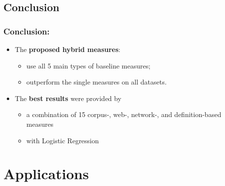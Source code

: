 \documentclass{beamer}
\begin{document}
\subsection{Conclusion}

\begin{frame}
\frametitle{Conclusion:}

\begin{itemize}
  


\item The \textbf{proposed hybrid measures}:


\begin{itemize}
  \item use all 5 main types of baseline measures;
  \item outperform the single measures on all datasets.
\end{itemize}  

  
\item The \textbf{best results} were provided by
\begin{itemize}
  \item  a combination of 15  corpus-, web-, network-, and definition-based measures
\item with Logistic Regression 
\end{itemize}
 
\end{itemize}


\end{frame}

\section{Applications}
\end{document}
